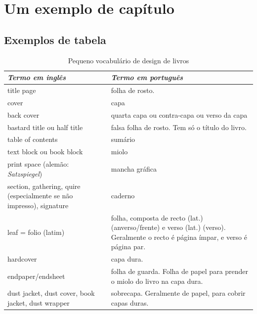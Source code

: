 \documentclass[a5paper]{memoir}
\begin{document}
\chapter{Um exemplo de capítulo}

\section{Exemplos de tabela}



\begin{table}
\caption{Pequeno vocabulário de design de livros\label{vocabulario-texto}}
\footnotesize
\begin{tabular}{p{5cm}p{5cm}}
\toprule
\textit{Termo em inglês} & \textit{Termo em português}\\
\midrule
\footnotesize
title page & folha de rosto.\\

cover & capa\\

back cover & quarta capa ou contra-capa ou verso da capa\\

bastard title ou half title & falsa folha de rosto. Tem só o título do livro.\\

table of contents & sumário\\

text block ou book block & miolo\\

print space (alemão: \textit{Satzspiegel}) & mancha gráfica\\

section, gathering, quire (especialmente se não impresso), signature & caderno\\

leaf = folio (latim) & folha, composta de recto (lat.) (anverso/frente) e verso (lat.) (verso). Geralmente o recto é página ímpar, e verso é página par.\\

hardcover & capa dura.\\

endpaper/endsheet & folha de guarda. Folha de papel para prender o miolo do livro na capa dura.\\

dust jacket, dust cover, book jacket, dust wrapper & sobrecapa. Geralmente de papel, para cobrir capas duras.\\


\end{tabular}
\end{table}
\end{document}

